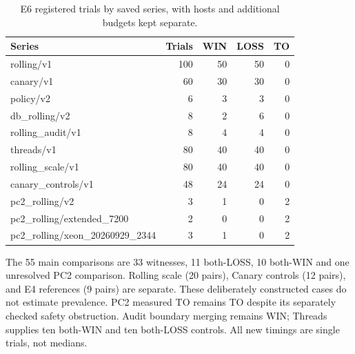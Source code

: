 \begin{table}[p]
\centering\small
\caption{E6 registered trials by saved series, with hosts and additional budgets kept separate.}
\label{tab:vthree-e6-series}
\setlength{\tabcolsep}{3pt}
\begin{tabular}{lrrrr}
\toprule
Series & Trials & WIN & LOSS & TO \\
\midrule
rolling/v1 & 100 & 50 & 50 & 0 \\
canary/v1 & 60 & 30 & 30 & 0 \\
policy/v2 & 6 & 3 & 3 & 0 \\
db\_rolling/v2 & 8 & 2 & 6 & 0 \\
rolling\_audit/v1 & 8 & 4 & 4 & 0 \\
threads/v1 & 80 & 40 & 40 & 0 \\
rolling\_scale/v1 & 80 & 40 & 40 & 0 \\
canary\_controls/v1 & 48 & 24 & 24 & 0 \\
pc2\_rolling/v2 & 3 & 1 & 0 & 2 \\
pc2\_rolling/extended\_7200 & 2 & 0 & 0 & 2 \\
pc2\_rolling/xeon\_20260929\_2344 & 3 & 1 & 0 & 2 \\
\bottomrule
\end{tabular}
\par\smallskip\footnotesize The 55 main comparisons are 33 witnesses, 11 both-LOSS, 10 both-WIN and one unresolved PC2 comparison. Rolling scale (20 pairs), Canary controls (12 pairs), and E4 references (9 pairs) are separate. These deliberately constructed cases do not estimate prevalence. PC2 measured TO remains TO despite its separately checked safety obstruction. Audit boundary merging remains WIN; Threads supplies ten both-WIN and ten both-LOSS controls. All new timings are single trials, not medians.
\end{table}
